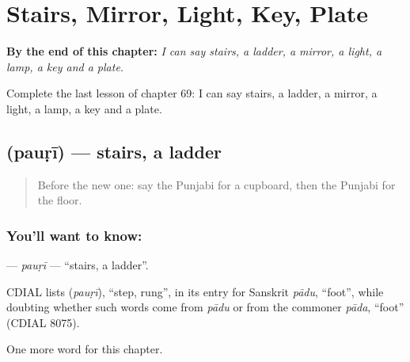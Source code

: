 
\chapter{Stairs, Mirror, Light, Key, Plate}
\label{ch:pa-stairs-mirror-light-key-plate}

\begin{chapteropening}
\textbf{By the end of this chapter:} \emph{I can say stairs, a ladder, a mirror, a light, a lamp, a key and a plate.}

Complete the last lesson of chapter 69: I can say stairs, a ladder, a mirror, a light, a lamp, a key and a plate.
\end{chapteropening}

\section[\texorpdfstring{\pa{ਪੌੜੀ} (pauṛī)}{ਪੌੜੀ (pauṛī)}]{ (pauṛī) — stairs, a ladder}

\label{lesson:PA-C69-pauri}



\begin{quote}
Before the new one: say the Punjabi for a cupboard, then the Punjabi for the floor.
\end{quote}

\subsection*{You'll want to know: }
\textbf{} — \emph{pauṛī} — \textquotedblleft{}stairs, a ladder\textquotedblright{}.

\begin{cousinweb}
CDIAL lists \textbf{} (\emph{pauṛī}), \textquotedblleft{}step, rung\textquotedblright{}, in its entry for Sanskrit \emph{pādu}, \textquotedblleft{}foot\textquotedblright{}, while doubting whether such words come from \emph{pādu} or from the commoner \emph{pāda}, \textquotedblleft{}foot\textquotedblright{} (CDIAL 8075).
\end{cousinweb}

\begin{grammarlens}[title={What you've built}]
One more word for this chapter.
\end{grammarlens}

